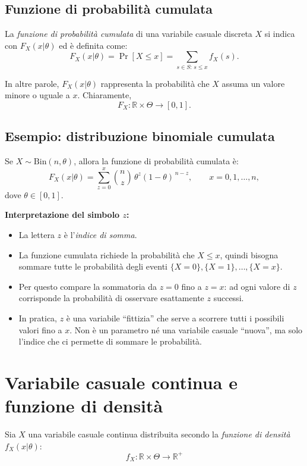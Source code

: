 \documentclass[a4paper,12pt]{article}
\begin{document}
	\subsection*{Funzione di probabilità cumulata}
	
	La \textit{funzione di probabilità cumulata} di una variabile casuale discreta $X$ si indica con $F_X(x|\theta)$ ed è definita come:
	\[
	F_X(x|\theta) = \Pr[X \leq x]
	= \sum_{s \in S: \, s \leq x} f_X(s).
	\]
	
	In altre parole, $F_X(x|\theta)$ rappresenta la probabilità che $X$ assuma un valore minore o uguale a $x$.  
	Chiaramente,
	\[
	F_X : \mathbb{R} \times \Theta \longrightarrow [0,1].
	\]
	
	\subsection*{Esempio: distribuzione binomiale cumulata}
	
	Se $X \sim \text{Bin}(n,\theta)$, allora la funzione di probabilità cumulata è:
	\[
	F_X(x|\theta) = \sum_{z=0}^{x} \binom{n}{z}\, \theta^z (1-\theta)^{\,n-z}, 
	\qquad x = 0,1,\ldots,n,
	\]
	dove $\theta \in [0,1]$.
	
	\bigskip
	
	\noindent
	\textbf{Interpretazione del simbolo $z$:}
	\begin{itemize}
		\item La lettera $z$ è l'\textit{indice di somma}.  
		\item La funzione cumulata richiede la probabilità che $X \leq x$, quindi bisogna sommare tutte le probabilità degli eventi $\{X=0\}, \{X=1\}, \ldots, \{X=x\}$.
		\item Per questo compare la sommatoria da $z=0$ fino a $z=x$: ad ogni valore di $z$ corrisponde la probabilità di osservare esattamente $z$ successi.
		\item In pratica, $z$ è una variabile “fittizia” che serve a scorrere tutti i possibili valori fino a $x$. Non è un parametro né una variabile casuale “nuova”, ma solo l’indice che ci permette di sommare le probabilità.
	\end{itemize} 
	
	\section*{Variabile casuale continua e funzione di densità}
	
	Sia $X$ una variabile casuale continua distribuita secondo la 
	\textit{funzione di densità} $f_X(x|\theta)$:
	\[
	f_X : \mathbb{R} \times \Theta \to \mathbb{R}^+
	\]
	
\end{document}
